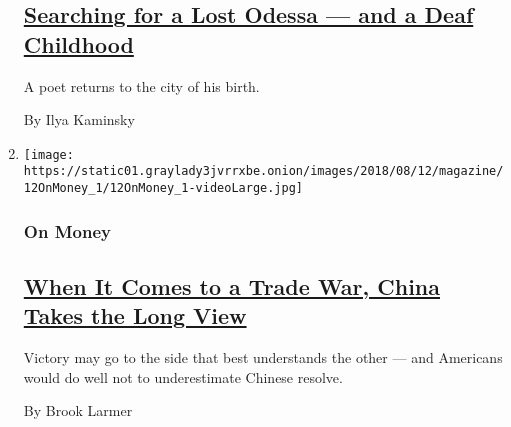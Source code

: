 \begin{enumerate}
  \hypertarget{searching-for-a-lost-odessa--and-a-deaf-childhood}{%
  \subsection{\texorpdfstring{\href{/2018/08/09/magazine/searching-for-a-lost-odessa-and-a-deaf-childhood.html}{Searching
  for a Lost Odessa --- and a Deaf
  Childhood}}{Searching for a Lost Odessa --- and a Deaf Childhood}}\label{searching-for-a-lost-odessa--and-a-deaf-childhood}}

  A poet returns to the city of his birth.

  By Ilya Kaminsky
\item
  \texttt{[image: https://static01.graylady3jvrrxbe.onion/images/2018/08/12/magazine/12OnMoney\_1/12OnMoney\_1-videoLarge.jpg]}

  \hypertarget{on-money}{%
  \subsubsection{On Money}\label{on-money}}

  \hypertarget{when-it-comes-to-a-trade-war-china-takes-the-long-view}{%
  \subsection{\texorpdfstring{\href{/2018/08/07/magazine/when-it-comes-to-a-trade-war-china-takes-the-long-view.html}{When
  It Comes to a Trade War, China Takes the Long
  View}}{When It Comes to a Trade War, China Takes the Long View}}\label{when-it-comes-to-a-trade-war-china-takes-the-long-view}}

  Victory may go to the side that best understands the other --- and
  Americans would do well not to underestimate Chinese resolve.

  By Brook Larmer
\end{enumerate}

